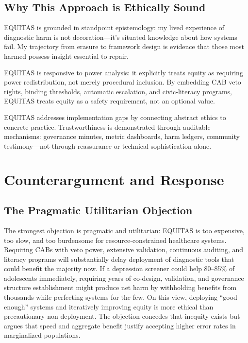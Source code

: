 \documentclass[12pt,a4paper]{article}
\begin{document}
\subsection{Why This Approach is Ethically Sound}

EQUITAS is grounded in standpoint epistemology: my lived experience of diagnostic harm is not decoration—it's situated knowledge about how systems fail. My trajectory from erasure to framework design is evidence that those most harmed possess insight essential to repair.\cite{garcia_ed415}

EQUITAS is responsive to power analysis: it explicitly treats equity as requiring power redistribution, not merely procedural inclusion. By embedding CAB veto rights, binding thresholds, automatic escalation, and civic-literacy programs, EQUITAS treats equity as a safety requirement, not an optional value.

EQUITAS addresses implementation gaps by connecting abstract ethics to concrete practice. Trustworthiness is demonstrated through auditable mechanisms: governance minutes, metric dashboards, harm ledgers, community testimony—not through reassurance or technical sophistication alone.

\section{Counterargument and Response}

\begin{tcolorbox}[colback=questionbg,colframe=questionborder,title=\textbf{GUIDING QUESTION:} Identify and respond to the strongest objection to your ethical position]
\end{tcolorbox}

\subsection{The Pragmatic Utilitarian Objection}

The strongest objection is pragmatic and utilitarian: EQUITAS is too expensive, too slow, and too burdensome for resource-constrained healthcare systems. Requiring CABs with veto power, extensive validation, continuous auditing, and literacy programs will substantially delay deployment of diagnostic tools that could benefit the majority now. If a depression screener could help 80--85\% of adolescents immediately, requiring years of co-design, validation, and governance structure establishment might produce net harm by withholding benefits from thousands while perfecting systems for the few. On this view, deploying ``good enough'' systems and iteratively improving equity is more ethical than precautionary non-deployment. The objection concedes that inequity exists but argues that speed and aggregate benefit justify accepting higher error rates in marginalized populations.
\end{document}
